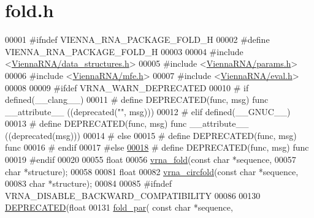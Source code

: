 \hypertarget{fold_8h_source}{}\section{fold.\+h}
\label{fold_8h_source}

\begin{DoxyCode}
00001 \textcolor{preprocessor}{#ifndef VIENNA\_RNA\_PACKAGE\_FOLD\_H}
00002 \textcolor{preprocessor}{#define VIENNA\_RNA\_PACKAGE\_FOLD\_H}
00003 
00004 \textcolor{preprocessor}{#include <\mbox{\hyperlink{data__structures_8h}{ViennaRNA/data\_structures.h}}>}
00005 \textcolor{preprocessor}{#include <\mbox{\hyperlink{params_8h}{ViennaRNA/params.h}}>}
00006 \textcolor{preprocessor}{#include <\mbox{\hyperlink{mfe_8h}{ViennaRNA/mfe.h}}>}
00007 \textcolor{preprocessor}{#include <\mbox{\hyperlink{eval_8h}{ViennaRNA/eval.h}}>}
00008 
00009 \textcolor{preprocessor}{#ifdef VRNA\_WARN\_DEPRECATED}
00010 \textcolor{preprocessor}{# if defined(\_\_clang\_\_)}
00011 \textcolor{preprocessor}{#  define DEPRECATED(func, msg) func \_\_attribute\_\_ ((deprecated("", msg)))}
00012 \textcolor{preprocessor}{# elif defined(\_\_GNUC\_\_)}
00013 \textcolor{preprocessor}{#  define DEPRECATED(func, msg) func \_\_attribute\_\_ ((deprecated(msg)))}
00014 \textcolor{preprocessor}{# else}
00015 \textcolor{preprocessor}{#  define DEPRECATED(func, msg) func}
00016 \textcolor{preprocessor}{# endif}
00017 \textcolor{preprocessor}{#else}
\mbox{\hyperlink{fold_8h_aab347a3c03fbe8e7319551b9fa0cce4a}{00018}} \textcolor{preprocessor}{# define DEPRECATED(func, msg) func}
00019 \textcolor{preprocessor}{#endif}
00020 
00055 \textcolor{keywordtype}{float}
00056 \mbox{\hyperlink{group__mfe__fold__single_ga29a33b2895f4e67b0480271ff289afdc}{vrna\_fold}}(\textcolor{keyword}{const} \textcolor{keywordtype}{char} *sequence,
00057           \textcolor{keywordtype}{char} *structure);
00058 
00081 \textcolor{keywordtype}{float}
00082 \mbox{\hyperlink{group__mfe__fold__single_gaf973483d8acbc8cc9aacfc8a9b7f0074}{vrna\_circfold}}(\textcolor{keyword}{const} \textcolor{keywordtype}{char} *sequence,
00083               \textcolor{keywordtype}{char} *structure);
00084 
00085 \textcolor{preprocessor}{#ifndef VRNA\_DISABLE\_BACKWARD\_COMPATIBILITY}
00086 
00130 \mbox{\hyperlink{fold_8h_aab347a3c03fbe8e7319551b9fa0cce4a}{DEPRECATED}}(\textcolor{keywordtype}{float}
00131 \mbox{\hyperlink{group__mfe__fold__single_ga2bc41df5d71fee6fd8da9904ee65d8fb}{fold\_par}}( \textcolor{keyword}{const} \textcolor{keywordtype}{char} *sequence,

\end{DoxyCode}
